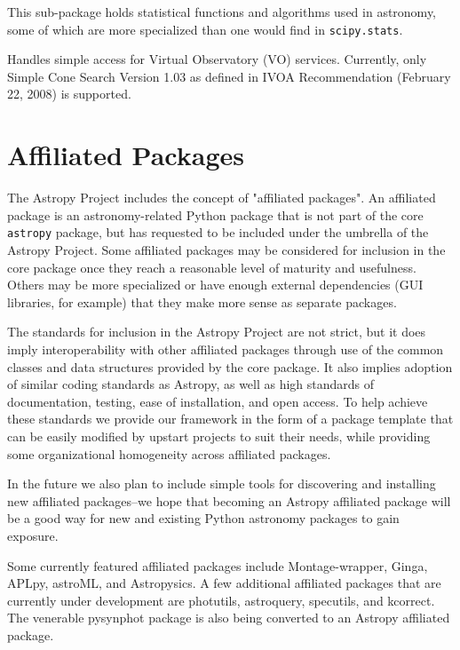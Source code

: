 \documentclass[11pt,twoside]{article}
\begin{document}
This sub-package holds statistical functions and algorithms used in astronomy,
some of which are more specialized than one would find in
\texttt{scipy.stats}.


Handles simple access for Virtual Observatory (VO) services.  Currently, only
Simple Cone Search Version 1.03 as defined in IVOA Recommendation (February 22,
2008) is supported.

\section{Affiliated Packages}

The Astropy Project includes the concept of "affiliated packages".  An
affiliated package is an astronomy-related Python package that is not part of
the core \texttt{astropy} package, but has requested to be included under the
umbrella of the Astropy Project.  Some affiliated packages may be considered
for inclusion in the core package once they reach a reasonable level of
maturity and usefulness.  Others may be more specialized or have enough
external dependencies (GUI libraries, for example) that they make more sense
as separate packages.

The standards for inclusion in the Astropy Project are not strict, but it does
imply interoperability with other affiliated packages through use of the
common classes and data structures provided by the core package.  It also
implies adoption of similar coding standards as Astropy, as well as high
standards of documentation, testing, ease of installation, and open access.
To help achieve these standards we provide our framework in the form of a
package template that can be easily modified by upstart projects to suit
their needs, while providing some organizational homogeneity across affiliated
packages.

In the future we also plan to include simple tools for discovering and
installing new affiliated packages--we hope that becoming an Astropy
affiliated package will be a good way for new and existing Python astronomy
packages to gain exposure.

Some currently featured affiliated packages include Montage-wrapper, Ginga,
APLpy, astroML, and Astropysics.  A few additional affiliated packages that
are currently under development are photutils, astroquery, specutils, and
kcorrect.  The venerable pysynphot package is also being converted to an
Astropy affiliated package.
\end{document}
